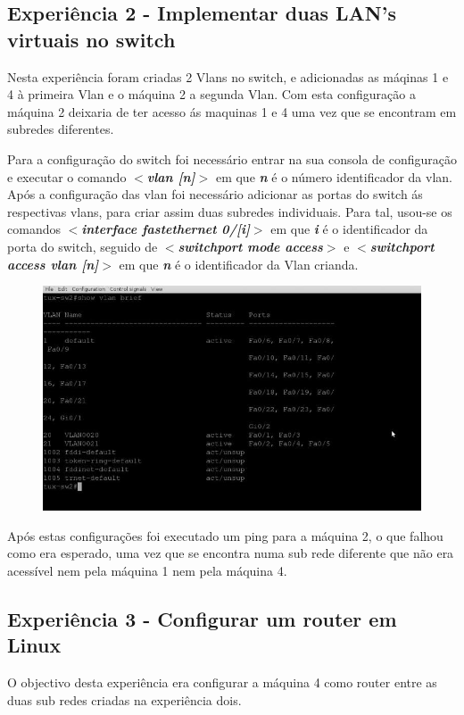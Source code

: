\documentclass[a4paper]{article}
\begin{document}
\subsection{Experiência 2 - Implementar duas LAN's virtuais no switch}
Nesta experiência foram criadas 2 Vlans no switch, e adicionadas as máqinas 1 e 4 à primeira Vlan e o máquina 2 a segunda Vlan. Com esta configuração a máquina 2 deixaria de ter acesso ás maquinas 1 e 4 uma vez que se encontram em subredes diferentes.


Para a configuração do switch foi necessário entrar na sua consola de configuração e executar o comando \textbf{\textit{$<$vlan [n]$>$}} em que \textbf{\textit{n}} é o número identificador da vlan. Após a configuração das vlan foi necessário adicionar as portas do switch ás respectivas vlans, para criar assim duas subredes individuais. Para tal, usou-se os comandos \textbf{\textit{$<$interface fastethernet 0/[i]$>$}} em que \textbf{\textit{i}} é o identificador da porta do switch, seguido de \textbf{\textit{$<$switchport mode access$>$}} e \textbf{\textit{$<$switchport access vlan [n]$>$}} em que \textit{\textbf{n}} é o identificador da Vlan crianda.

\begin{figure}[h!]
\centering
\includegraphics[scale=0.3]{res/image3.jpg}
\end{figure}

Após estas configurações foi executado um ping para a máquina 2, o que falhou como era esperado, uma vez que se encontra numa sub rede diferente que não era acessível nem pela máquina 1 nem pela máquina 4.

\subsection{Experiência 3 - Configurar um router em Linux}
O objectivo desta experiência era configurar a máquina 4 como router entre as duas sub redes criadas na experiência dois.
\end{document}
